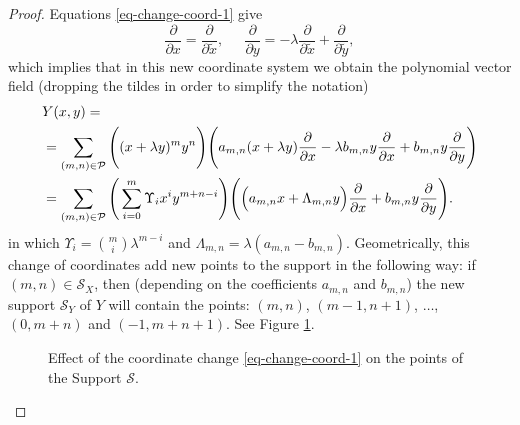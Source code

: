 \documentclass[12pt]{amsart}
\begin{document}
\begin{proof}

Equations \eqref{eq-change-coord-1} give
$$\displaystyle\frac{\partial}{\partial x} = \displaystyle\frac{\partial}{\partial \widetilde{x}}, \ \quad \ \displaystyle\frac{\partial}{\partial y} = -\lambda\displaystyle\frac{\partial}{\partial \widetilde{x}} + \displaystyle\frac{\partial}{\partial \widetilde{y}},$$
which implies that in this new coordinate system we obtain the polynomial vector field (dropping the tildes in order to simplify the notation)
\begin{equation*}
\begin{split}
& Y(x,y) = \\
& = \sum_{(m,n)\in\mathcal{P}}\Bigg{(}(x+\lambda y)^{m}y^{n}\Bigg{)}\Bigg{(}a_{m,n}(x+\lambda y)\displaystyle\frac{\partial}{\partial x} -\lambda b_{m,n}y\displaystyle\frac{\partial}{\partial x} + b_{m,n}y\displaystyle\frac{\partial}{\partial y}\Bigg{)} \\
 & = \sum_{(m,n)\in\mathcal{P}}\Bigg{(}\displaystyle\sum_{i = 0}^{m}\Upsilon_{i}x^{i}y^{m+n-i}\Bigg{)}\Bigg{(}\Big{(}a_{m,n}x+ \Lambda_{m,n}y\Big{)}\displaystyle\frac{\partial}{\partial x} + b_{m,n}y\displaystyle\frac{\partial}{\partial y}\Bigg{)}.
\end{split}
\end{equation*}
in which $\Upsilon_{i} = \binom{m}{i}\lambda^{m-i}$ and $\Lambda_{m,n} = \lambda(a_{m,n}-b_{m,n})$. Geometrically, this change of coordinates add new points to the support in the following way: if $(m,n)\in\mathcal{S}_{X}$, then (depending on the coefficients $a_{m,n}$ and $b_{m,n}$) the new support $\mathcal{S}_{Y}$ of $Y$ will contain the points: $(m,n)$, $(m-1,n+1)$, $\dots$, $(0,m+n)$ and $(-1,m+n+1)$. See Figure \ref{fig-coord-change}.

\begin{figure}[h]
\caption{\footnotesize{Effect of the coordinate change \eqref{eq-change-coord-1} on the points of the Support $\mathcal{S}$.}}
\label{fig-coord-change}
\end{figure}



\end{proof}
\end{document}

